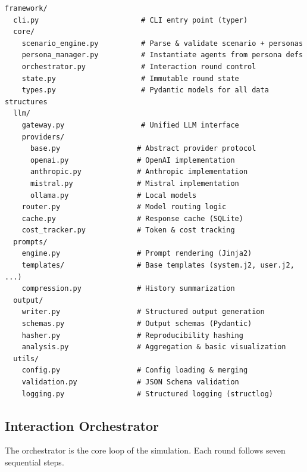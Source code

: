 \documentclass[12pt, a4paper]{article}
\begin{document}
\begin{lstlisting}[style=directory, caption={Proposed project directory structure.}]
framework/
  cli.py                        # CLI entry point (typer)
  core/
    scenario_engine.py          # Parse & validate scenario + personas
    persona_manager.py          # Instantiate agents from persona defs
    orchestrator.py             # Interaction round control
    state.py                    # Immutable round state
    types.py                    # Pydantic models for all data structures
  llm/
    gateway.py                  # Unified LLM interface
    providers/
      base.py                  # Abstract provider protocol
      openai.py                # OpenAI implementation
      anthropic.py             # Anthropic implementation
      mistral.py               # Mistral implementation
      ollama.py                # Local models
    router.py                  # Model routing logic
    cache.py                   # Response cache (SQLite)
    cost_tracker.py            # Token & cost tracking
  prompts/
    engine.py                  # Prompt rendering (Jinja2)
    templates/                 # Base templates (system.j2, user.j2, ...)
    compression.py             # History summarization
  output/
    writer.py                  # Structured output generation
    schemas.py                 # Output schemas (Pydantic)
    hasher.py                  # Reproducibility hashing
    analysis.py                # Aggregation & basic visualization
  utils/
    config.py                  # Config loading & merging
    validation.py              # JSON Schema validation
    logging.py                 # Structured logging (structlog)
\end{lstlisting}

\subsection{Interaction Orchestrator}

The orchestrator is the core loop of the simulation. Each round follows seven sequential steps.
\end{document}
